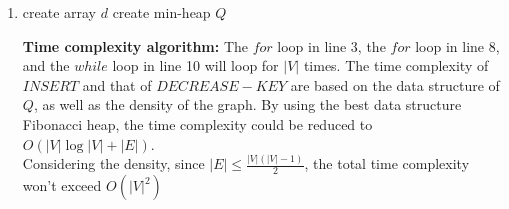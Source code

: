 \documentclass[12pt,a4paper]{article}
\makeatletter
\newtheorem*{solution}{Solution}
\theoremstyle{definition}
\renewenvironment{solution}[1][Solution] {\par\pushQED{\qed}\normalfont\topsep6\p@\@plus6\p@\relax\trivlist\item[\hskip\labelsep\bfseries#1\@addpunct{.}]\ignorespaces}{\popQED\endtrivlist\@endpefalse} \makeatother
\makeatother
\begin{document}
\begin{enumerate}
\begin{solution}
\begin{algorithm}[H]
	        \BlankLine
	        create array $d$\;
            create min-heap $Q$\;
            \BlankLine
            \BlankLine
    \end{algorithm}
    \textbf{Time complexity algorithm:}
    The $for$ loop in line 3, the $for$ loop in line 8, and the $while$ loop in line 10 will loop for $|V|$ times. The time complexity of $INSERT$ and that of $DECREASE-KEY$ are based on the data structure of $Q$, as well as the density of the graph. 
    By using the best data structure Fibonacci heap, the time complexity could be reduced to $O(|V|\log |V|+|E|)$.
    \\
    Considering the density, since $|E|\leq\frac{|V|(|V|-1)}{2}$, the total time complexity won't exceed $O(|V|^2)$
    \\
    

\end{solution}
\end{enumerate}
\end{document}
